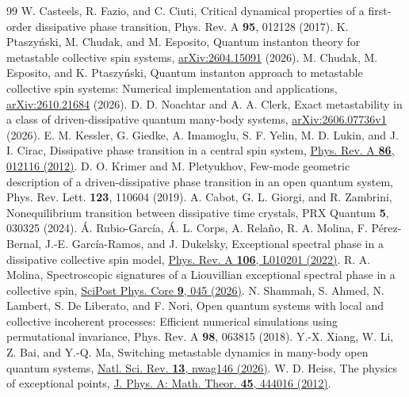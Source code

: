 \documentclass[aps,pra,twocolumn,superscriptaddress,amsmath,amssymb,reprint,floatfix]{revtex4-2}
\begin{document}
\begin{thebibliography}{99}
 W. Casteels, R. Fazio, and C. Ciuti, Critical dynamical properties of a first-order dissipative phase transition, Phys. Rev. A \textbf{95}, 012128 (2017).
 K. Ptaszy\'nski, M. Chudak, and M. Esposito, Quantum instanton theory for metastable collective spin systems, \href{https://arxiv.org/abs/2604.15091}{arXiv:2604.15091} (2026).
 M. Chudak, M. Esposito, and K. Ptaszy\'nski, Quantum instanton approach to metastable collective spin systems: Numerical implementation and applications, \href{https://arxiv.org/abs/2610.21684}{arXiv:2610.21684} (2026).
 D. D. Noachtar and A. A. Clerk, Exact metastability in a class of driven-dissipative quantum many-body systems, \href{https://arxiv.org/abs/2606.07736v1}{arXiv:2606.07736v1} (2026).
 E. M. Kessler, G. Giedke, A. Imamoglu, S. F. Yelin, M. D. Lukin, and J. I. Cirac, Dissipative phase transition in a central spin system, \href{https://doi.org/10.1103/PhysRevA.86.012116}{Phys. Rev. A \textbf{86}, 012116 (2012)}.
 D. O. Krimer and M. Pletyukhov, Few-mode geometric description of a driven-dissipative phase transition in an open quantum system, Phys. Rev. Lett. \textbf{123}, 110604 (2019).
 A. Cabot, G. L. Giorgi, and R. Zambrini, Nonequilibrium transition between dissipative time crystals, PRX Quantum \textbf{5}, 030325 (2024).
 \'A. Rubio-Garc\'ia, \'A. L. Corps, A. Rela\~no, R. A. Molina, F. P\'erez-Bernal, J.-E. Garc\'ia-Ramos, and J. Dukelsky, Exceptional spectral phase in a dissipative collective spin model, \href{https://doi.org/10.1103/PhysRevA.106.L010201}{Phys. Rev. A \textbf{106}, L010201 (2022)}.
 R. A. Molina, Spectroscopic signatures of a Liouvillian exceptional spectral phase in a collective spin, \href{https://doi.org/10.21468/SciPostPhysCore.9.3.045}{SciPost Phys. Core \textbf{9}, 045 (2026)}.
 N. Shammah, S. Ahmed, N. Lambert, S. De Liberato, and F. Nori, Open quantum systems with local and collective incoherent processes: Efficient numerical simulations using permutational invariance, Phys. Rev. A \textbf{98}, 063815 (2018).
 Y.-X. Xiang, W. Li, Z. Bai, and Y.-Q. Ma, Switching metastable dynamics in many-body open quantum systems, \href{https://doi.org/10.1093/nsr/nwag146}{Natl. Sci. Rev. \textbf{13}, nwag146 (2026)}.
 W. D. Heiss, The physics of exceptional points, \href{https://doi.org/10.1088/1751-8113/45/44/444016}{J. Phys. A: Math. Theor. \textbf{45}, 444016 (2012)}.

\end{thebibliography}
\end{document}
